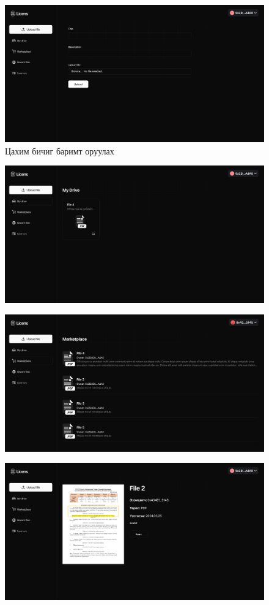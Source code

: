 \begin{figure}[h!]
	\centering
	\includegraphics[scale=0.155]{src/images/upload-page.png}
	\caption{Цахим бичиг баримт оруулах}
\end{figure}

\begin{figure}[h!]
	\centering
	\includegraphics[scale=0.165]{src/images/drive-page.png}
	\caption{}
\end{figure}

\begin{figure}[h!]
	\centering
	\includegraphics[scale=0.165]{src/images/marketplace-page.png}
	\caption{}
\end{figure}

\begin{figure}[h!]
	\centering
	\includegraphics[scale=0.165]{src/images/file-page.png}
	\caption{}
\end{figure}